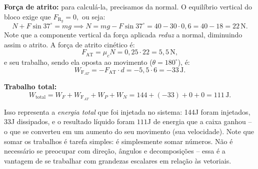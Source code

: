 \begin{exemplo}[Nível II]
\textbf{Força de atrito:} para calculá-la, precisamos da normal. O equilíbrio
vertical do bloco exige que $F_{\text{R}_y}=0,$ ou seja:
%
\begin{equation*}
    N + F\sin 37^\circ = mg \implies N = mg - F\sin 37^\circ = 40 - 30 \cdot 0{,}6
    = 40 - 18 = 22\,\text{N}.
\end{equation*}
%
Note que a componente vertical da força aplicada \textit{reduz} a normal,
diminuindo assim o atrito. A força de atrito cinético é:
%
\begin{equation*}
    F_\text{AT} = \mu_c N = 0{,}25 \cdot 22 = 5{,}5\,\text{N},
\end{equation*}
%
e seu trabalho, sendo ela oposta ao movimento ($\theta = 180^\circ$), é:
%
\begin{equation*}
    W_{\text{F}_{AT}} = -F_\text{AT} \cdot d = -5{,}5 \cdot 6 = -33\,\text{J}.
\end{equation*}
 
\textbf{Trabalho total:}
%
\begin{equation*}
    W_{\text{total}} = W_F + W_{\text{F}_{AT}} + W_P + W_N = 144 + (-33) + 0 + 0
    = \boxed{111\,\text{J}.}
\end{equation*}

Isso representa a \emph{energia total} que foi injetada no sistema: 144J foram injetados, 33J dissipados, e o resultado líquido foram $111$J de energia que a caixa ganhou -- o que se converteu em um aumento do seu movimento (sua velocidade). Note que somar os trabalhos é tarefa simples: é simplesmente somar números. Não é necessário se preocupar com direção, ângulos e decomposições -- essa é a vantagem de se trabalhar com grandezas escalares em relação às vetoriais.

\end{exemplo}


\vspace{0.3cm}





